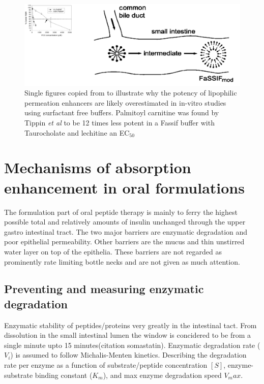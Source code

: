 \begin{figure}[ht]
\label{devel_fassif}
\includegraphics[width=\textwidth,height=\textheight,keepaspectratio]{graphics/devel_Fasssif_PCC2.png}
\caption{Single figures copied from \cite{tippin2008biorelevant,nawroth2011liposome} to illustrate why the potency of lipophilic permeation enhancers are likely overestimated in in-vitro studies using surfactant free buffers. Palmitoyl carnitine was found by Tippin \textit{et al} to be 12 times less potent in a Fassif buffer with Taurocholate and lechitine an EC$_{50}$}
\end{figure}

\section{Mechanisms of absorption enhancement in oral formulations}

The formulation part of oral peptide therapy is mainly to ferry the highest possible total and relatively amounts of insulin unchanged through the upper gastro intestinal tract. The two major barriers are enzymatic degradation and poor epithelial permeability. Other barriers are the mucus and thin unstirred water layer on top of the epithelia. These barriers are not regarded as prominently rate limiting bottle necks and are not given as much attention.

\subsection{Preventing and measuring enzymatic degradation}
Enzymatic stability of peptides/proteins very greatly in the intestinal tact. From dissolution in the small intestinal lumen the window is concidered to be from a single minute upto 15 minutes(citation somastatin). Enzymatic degradation rate ($V_i$) is assumed to follow Michalis-Menten kinetics. Describing the degradation rate per enzyme as a function of substrate/peptide concentration $[S]$, enzyme-substrate binding constant ($K_m$), and max enzyme degradation speed $V_max$.

